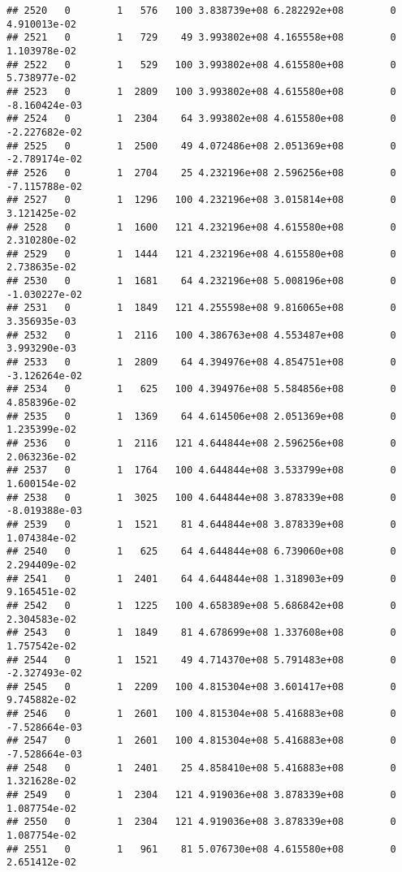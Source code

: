 \documentclass[
]{article}
\begin{document}
\begin{enumerate}
\begin{verbatim}
## 2520   0        1   576   100 3.838739e+08 6.282292e+08        0  4.910013e-02
## 2521   0        1   729    49 3.993802e+08 4.165558e+08        0  1.103978e-02
## 2522   0        1   529   100 3.993802e+08 4.615580e+08        0  5.738977e-02
## 2523   0        1  2809   100 3.993802e+08 4.615580e+08        0 -8.160424e-03
## 2524   0        1  2304    64 3.993802e+08 4.615580e+08        0 -2.227682e-02
## 2525   0        1  2500    49 4.072486e+08 2.051369e+08        0 -2.789174e-02
## 2526   0        1  2704    25 4.232196e+08 2.596256e+08        0 -7.115788e-02
## 2527   0        1  1296   100 4.232196e+08 3.015814e+08        0  3.121425e-02
## 2528   0        1  1600   121 4.232196e+08 4.615580e+08        0  2.310280e-02
## 2529   0        1  1444   121 4.232196e+08 4.615580e+08        0  2.738635e-02
## 2530   0        1  1681    64 4.232196e+08 5.008196e+08        0 -1.030227e-02
## 2531   0        1  1849   121 4.255598e+08 9.816065e+08        0  3.356935e-03
## 2532   0        1  2116   100 4.386763e+08 4.553487e+08        0  3.993290e-03
## 2533   0        1  2809    64 4.394976e+08 4.854751e+08        0 -3.126264e-02
## 2534   0        1   625   100 4.394976e+08 5.584856e+08        0  4.858396e-02
## 2535   0        1  1369    64 4.614506e+08 2.051369e+08        0  1.235399e-02
## 2536   0        1  2116   121 4.644844e+08 2.596256e+08        0  2.063236e-02
## 2537   0        1  1764   100 4.644844e+08 3.533799e+08        0  1.600154e-02
## 2538   0        1  3025   100 4.644844e+08 3.878339e+08        0 -8.019388e-03
## 2539   0        1  1521    81 4.644844e+08 3.878339e+08        0  1.074384e-02
## 2540   0        1   625    64 4.644844e+08 6.739060e+08        0  2.294409e-02
## 2541   0        1  2401    64 4.644844e+08 1.318903e+09        0  9.165451e-02
## 2542   0        1  1225   100 4.658389e+08 5.686842e+08        0  2.304583e-02
## 2543   0        1  1849    81 4.678699e+08 1.337608e+08        0  1.757542e-02
## 2544   0        1  1521    49 4.714370e+08 5.791483e+08        0 -2.327493e-02
## 2545   0        1  2209   100 4.815304e+08 3.601417e+08        0  9.745882e-02
## 2546   0        1  2601   100 4.815304e+08 5.416883e+08        0 -7.528664e-03
## 2547   0        1  2601   100 4.815304e+08 5.416883e+08        0 -7.528664e-03
## 2548   0        1  2401    25 4.858410e+08 5.416883e+08        0  1.321628e-02
## 2549   0        1  2304   121 4.919036e+08 3.878339e+08        0  1.087754e-02
## 2550   0        1  2304   121 4.919036e+08 3.878339e+08        0  1.087754e-02
## 2551   0        1   961    81 5.076730e+08 4.615580e+08        0  2.651412e-02

\end{verbatim}
\end{enumerate}
\end{document}
